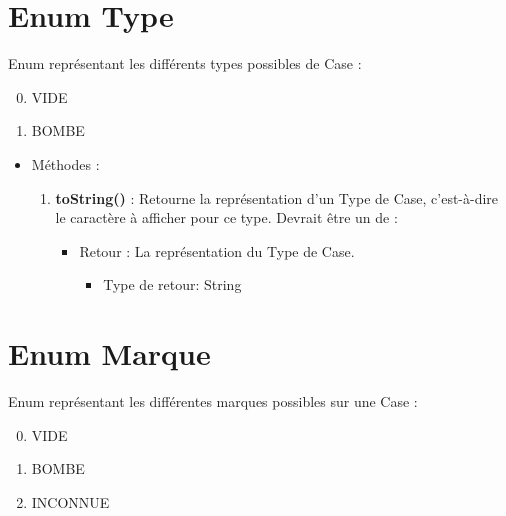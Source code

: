 \section {Enum Type}

Enum représentant les différents types possibles de Case :
\begin{enumerate}
  \setcounter{enumi}{-1}
\item VIDE
\item BOMBE
\end{enumerate}

\begin{itemize}
\item Méthodes : 

  \begin{enumerate}
    
    
  \item {\bf toString() }: Retourne la représentation d'un Type de Case, c'est-à-dire le caractère à afficher pour ce type. Devrait être un de : 
    
    \begin{itemize}
    \item Retour : La représentation du Type de Case.
      \begin{itemize}
      \item Type de retour: String
      \end{itemize}
    \end{itemize}
  \end{enumerate}
\end{itemize}

\section {Enum Marque}

Enum représentant les différentes marques possibles sur une Case :
\begin{enumerate}
  \setcounter{enumi}{-1}
\item VIDE
\item BOMBE
\item INCONNUE
\end{enumerate}

